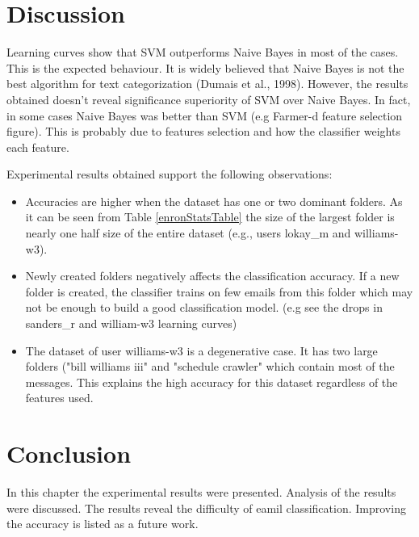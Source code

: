 \section{Discussion}
Learning curves show that SVM outperforms Naive Bayes in most of the cases. This is the expected behaviour. It is widely believed that Naive Bayes is not the best algorithm for text categorization (Dumais et al., 1998). %
However, the results obtained doesn't reveal significance superiority of SVM over Naive Bayes. In fact, in some cases Naive Bayes was better than SVM (e.g Farmer-d feature selection figure). This is probably due to features selection and how the classifier weights each feature.


Experimental results obtained support the following observations:
\begin{itemize}
\item Accuracies are higher when the dataset has one or two dominant folders. As it can be seen from Table \ref{enronStatsTable}
 the size of the largest folder is nearly one half size of the entire dataset (e.g., users lokay\_m and williams-w3).

\item Newly created folders negatively affects the classification accuracy. If a new folder is created, the classifier trains on few emails from this folder which may not be enough to build a good classification model. (e.g see the drops in sanders\_r and william-w3 learning curves)

\item The dataset of user williams-w3 is a degenerative case. It has two large folders ("bill williams iii" and "schedule crawler" which contain most of the messages. This explains the high accuracy for this dataset regardless of the features used.

\end{itemize}

\section{Conclusion}
In this chapter the experimental results were presented. Analysis of the results were discussed. The results reveal the difficulty of eamil classification. Improving the accuracy is listed as a future work.

